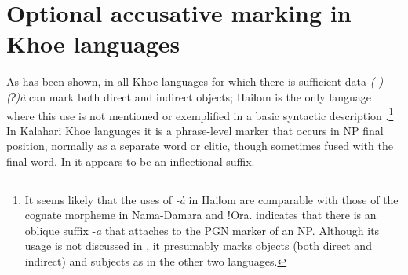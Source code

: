 \documentclass[output=paper]{LSP/langsci}
\begin{document}
\section{Optional accusative marking in Khoe languages} \label{09-mc-sec:3} 
\largerpage
As has been shown, in all Khoe languages for which there is sufficient data \textit{(-)(ʔ)à} can mark both direct and indirect objects; Haiǁom is the only language where this use is not mentioned or exemplified in a basic syntactic description \citep{Widlok2013Syntax}.\footnote{It seems likely that the uses of \textit{-à} in Haiǁom are comparable with those of the cognate morpheme in Nama-Damara and ǃOra. \citet[158]{Widlok2013Morphology} indicates that there is an oblique suffix -\textit{a} that attaches to the PGN marker of an NP. Although its usage is not discussed in \citet{Widlok2013Morphology}, it presumably marks objects (both direct and indirect) and subjects as in the other two  languages.} In Kalahari Khoe languages it is a phrase-level marker that occurs in NP final position, normally as a separate word or clitic, though sometimes fused with the final word. In  it appears to be an inflectional suffix.
\end{document}

